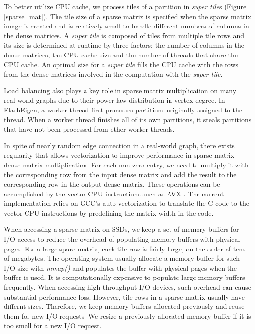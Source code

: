 To better utilize CPU cache, we process tiles of a partition in
\textit{super tile}s (Figure \ref{sparse_mat}). The tile size of a sparse
matrix is specified when the sparse matrix image is created and is relatively
small to handle different numbers of columns in the dense matrices.
A \textit{super tile} is composed of tiles from multiple tile rows and its
size is determined at runtime by three factors: the number of columns
in the dense matrices, the CPU cache size and the number of threads that
share the CPU cache. An optimal size for a \textit{super tile} fills
the CPU cache with the rows from the dense matrices involved in
the computation with the \textit{super tile}.

Load balancing also plays a key role in sparse matrix multiplication on
many real-world graphs due to their power-law distribution in vertex degree.
In FlashEigen, a worker thread first processes partitions originally assigned
to the thread. When a worker thread finishes
all of its own partitions, it steals partitions that have not been processed
from other worker threads.

In spite of nearly random edge connection in a real-world graph,
there exists regularity that allows vectorization to improve performance
in sparse matrix dense matrix multiplication. For each non-zero entry, we
need to multiply it with the corresponding row from the input dense matrix
and add the result to the corresponding row in the output dense matrix.
These operations can be accomplished by the vector CPU instructions such as
AVX \cite{avx}. The current implementation relies on GCC's auto-vectorization
to translate the C code to the vector CPU instructions by predefining the matrix
width in the code.

When accessing a sparse matrix on SSDs, we keep a set of memory buffers for
I/O access to reduce the overhead of populating memory buffers with physical
pages. For a large spare matrix, each tile row is fairly large, on the order
of tens of megabytes. The operating system usually allocate a memory buffer
for such I/O size with \textit{mmap()} and populates the buffer with physical
pages when the buffer is used. It is computationally expensive to populate
large memory buffers frequently. When accessing high-throughput I/O devices,
such overhead can cause substantial performance loss. However, tile rows
in a sparse matrix usually have differnt sizes. Therefore, we keep memory buffers
allocated previously and reuse them for new I/O requests. We resize a previously
allocated memory buffer if it is too small for a new I/O request.


